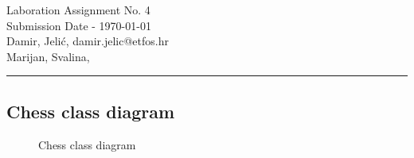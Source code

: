 \documentclass[11pt,a4paper]{article}
\begin{document}
\large
Laboration Assignment No. 4\\
Submission Date - \yyyymmdddate \today \\
Damir, Jelić, damir.jelic@etfos.hr \\
Marijan, Svalina, %
\\
\rule{\linewidth}{0.1mm}

\setcounter{section}{4}
\subsection{Chess class diagram}
\begin{figure}[htb]
    \begin{center}
        \setlength\fboxsep{0pt}
        \caption{Chess class diagram}
        \label{fig:class_diag}
    \end{center}
\end{figure}
\end{document}
